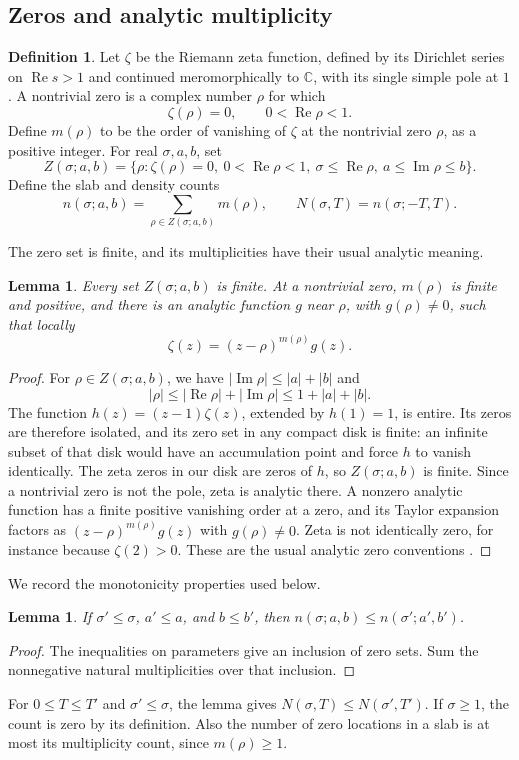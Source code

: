 \documentclass[11pt,a4paper,oneside]{article}
\newtheorem{lemma}[theorem]{Lemma}
\theoremstyle{definition}
\newtheorem{definition}[theorem]{Definition}
\newcommand{\C}{\mathbb C}
\newcommand{\Rea}{\operatorname{Re}}
\newcommand{\Ima}{\operatorname{Im}}
\numberwithin{equation}{section}
\begin{document}
\subsection{Zeros and analytic multiplicity}
\begin{definition}
Let $\zeta$ be the Riemann zeta function, defined by its Dirichlet series on $\Rea s>1$ and continued meromorphically to $\C$, with its single simple pole at $1$. A nontrivial zero is a complex
number $\rho$ for which
\[
 \zeta(\rho)=0,\qquad 0<\Rea\rho<1.
\]
Define $m(\rho)$ to be the order of vanishing of $\zeta$ at the nontrivial zero $\rho$, as a positive integer. For real $\sigma,a,b$, set
\[
 Z(\sigma;a,b)=\{\rho:\zeta(\rho)=0,\ 0<\Rea\rho<1,\
                  \sigma\le\Rea\rho,\ a\le\Ima\rho\le b\}.
\]
Define the slab and density counts
\[
 n(\sigma;a,b)=\sum_{\rho\in Z(\sigma;a,b)}m(\rho),\qquad
 N(\sigma,T)=n(\sigma;-T,T).
\]
\end{definition}
The zero set is finite, and its multiplicities have their usual analytic meaning.
\begin{lemma}
Every set $Z(\sigma;a,b)$ is finite. At a nontrivial zero, $m(\rho)$ is finite
and positive, and there is an analytic function $g$ near $\rho$, with
$g(\rho)\ne0$, such that locally
\[
 \zeta(z)=(z-\rho)^{m(\rho)}g(z).
\]
\end{lemma}
\begin{proof}
For $\rho\in Z(\sigma;a,b)$, we have
$|\Ima\rho|\le |a|+|b|$ and
\[
 |\rho|\le |\Rea\rho|+|\Ima\rho|\le1+|a|+|b|.
\]
The function $h(z)=(z-1)\zeta(z)$, extended by $h(1)=1$, is entire. Its zeros are therefore isolated, and its zero set in any compact disk is finite: an infinite subset of that disk would have an accumulation point and force $h$ to vanish identically. The zeta zeros in our disk are zeros of $h$, so $Z(\sigma;a,b)$ is finite. Since a nontrivial zero is not the pole, zeta is analytic there. A nonzero analytic function has a finite positive vanishing order at a zero, and its Taylor expansion factors as $(z-\rho)^{m(\rho)}g(z)$ with $g(\rho)\ne0$. Zeta is not identically zero, for instance because $\zeta(2)>0$. These are the usual analytic zero conventions \cite[Chapter~5]{IwaniecKowalski}.
\end{proof}
We record the monotonicity properties used below.
\begin{lemma}
If $\sigma'\le\sigma$, $a'\le a$, and $b\le b'$, then
$n(\sigma;a,b)\le n(\sigma';a',b')$.
\end{lemma}
\begin{proof}
The inequalities on parameters give an inclusion of zero sets. Sum the
nonnegative natural multiplicities over that inclusion.
\end{proof}
For $0\le T\le T'$ and $\sigma'\le\sigma$, the lemma gives $N(\sigma,T)\le N(\sigma',T')$. If $\sigma\ge1$, the count is zero by its definition. Also the number of zero locations in a slab is at most its multiplicity count, since $m(\rho)\ge1$.
\end{document}
